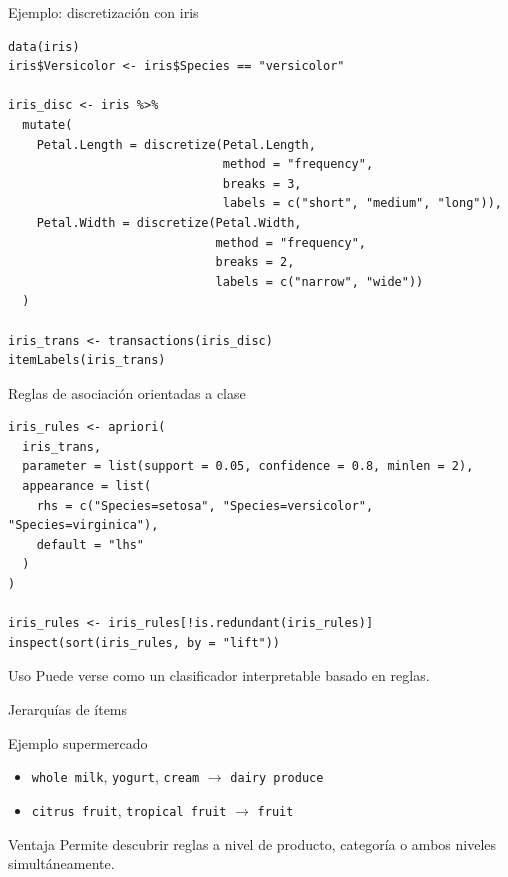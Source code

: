 \documentclass[10pt,aspectratio=169]{beamer}
\begin{document}
\begin{frame}[fragile]{Ejemplo: discretización con iris}
\begin{lstlisting}[style=rcode]
data(iris)
iris$Versicolor <- iris$Species == "versicolor"

iris_disc <- iris %>%
  mutate(
    Petal.Length = discretize(Petal.Length,
                              method = "frequency",
                              breaks = 3,
                              labels = c("short", "medium", "long")),
    Petal.Width = discretize(Petal.Width,
                             method = "frequency",
                             breaks = 2,
                             labels = c("narrow", "wide"))
  )

iris_trans <- transactions(iris_disc)
itemLabels(iris_trans)
\end{lstlisting}
\end{frame}

\begin{frame}[fragile]{Reglas de asociación orientadas a clase}
\begin{lstlisting}[style=rcode]
iris_rules <- apriori(
  iris_trans,
  parameter = list(support = 0.05, confidence = 0.8, minlen = 2),
  appearance = list(
    rhs = c("Species=setosa", "Species=versicolor", "Species=virginica"),
    default = "lhs"
  )
)

iris_rules <- iris_rules[!is.redundant(iris_rules)]
inspect(sort(iris_rules, by = "lift"))
\end{lstlisting}

\begin{block}{Uso}
Puede verse como un clasificador interpretable basado en reglas.
\end{block}
\end{frame}

\begin{frame}{Jerarquías de ítems}
\begin{exampleblock}{Ejemplo supermercado}
\begin{itemize}
  \item \texttt{whole milk}, \texttt{yogurt}, \texttt{cream} $\rightarrow$ \texttt{dairy produce}
  \item \texttt{citrus fruit}, \texttt{tropical fruit} $\rightarrow$ \texttt{fruit}
\end{itemize}
\end{exampleblock}

\begin{block}{Ventaja}
Permite descubrir reglas a nivel de producto, categoría o ambos niveles simultáneamente.
\end{block}
\end{frame}
\end{document}
